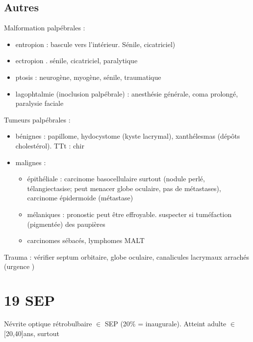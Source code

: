 \documentclass[11pt]{article}
\begin{document}
\subsection{Autres}
\label{sec:org6a3a6b3}
Malformation palpébrales : 
\begin{itemize}
\item entropion : bascule vers l'intérieur. Sénile, cicatriciel)
\item ectropion . sénile, cicatriciel, paralytique
\item ptosis : neurogène, myogène, sénile, traumatique
\item lagophtalmie (inoclusion palpébrale) : anesthésie générale, coma prolongé,
paralysie faciale
\end{itemize}
Tumeurs palpébrales :
\begin{itemize}
\item bénignes : papillome, hydocystome (kyste lacrymal), xanthélesmas (dépôts
cholestérol). TTt : chir
\item malignes : 
\begin{itemize}
\item épithéliale : carcinome basocellulaire surtout (nodule perlé,
télangiectasise; peut menacer globe oculaire, pas de métastases), carcinome
épidermoide (métastase)
\item mélaniques : pronostic peut être effroyable. suspecter si tuméfaction
(pigmentée) des paupières
\item carcinomes sébacés, lymphomes MALT
\end{itemize}
\end{itemize}
Trauma : vérifier septum orbitaire, globe oculaire, canalicules lacrymaux
arrachés (urgence \skull)

\section{19 SEP}
\label{sec:org9cb9f18}
Névrite optique rétrobulbaire \(\in\) SEP (20\% = inaugurale). Atteint adulte \(\in\)
[20,40]ans, surtout \female
\end{document}
